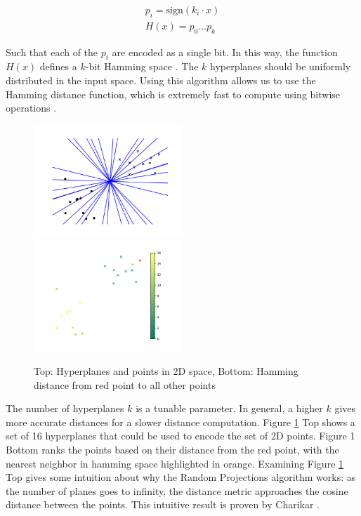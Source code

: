 \begin{align}
    p_i = \text{sign}(k_i \cdot x) \\
    H(x) = p_0...p_k
\end{align}

Such that each of the $p_i$ are encoded as a single bit. In this way, the function $H(x)$ defines a $k$-bit Hamming space \cite{hamming1950error}. The $k$ hyperplanes should be uniformly distributed in the input space. Using this algorithm allows us to use the Hamming distance function, which is extremely fast to compute using bitwise operations \cite{cohen1997covering}.

\begin{figure}[h]
    \includegraphics[width=0.5\textwidth]{images/lsh_planes.png}
    \includegraphics[width=0.5\textwidth]{images/lsh_distance.png}
    \caption{Top: Hyperplanes and points in 2D space, Bottom: Hamming distance from red point to all other points}
    \label{fig:lsh}
\end{figure}

The number of hyperplanes $k$ is a tunable parameter. In general, a higher $k$ gives more accurate distances for a slower distance computation. Figure \ref{fig:lsh} Top shows a set of 16 hyperplanes that could be used to encode the set of 2D points. Figure 1 Bottom ranks the points based on their distance from the red point, with the nearest neighbor in hamming space highlighted in orange. Examining Figure \ref{fig:lsh} Top gives some intuition about why the Random Projections algorithm works: as the number of planes goes to infinity, the distance metric approaches the cosine distance between the points. This intuitive result is proven by Charikar \cite{charikar2002similarity}.


